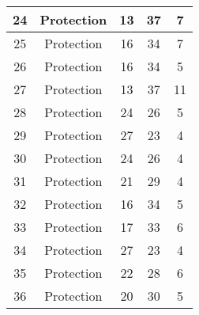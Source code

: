 \documentclass[results.tex]{subfiles}
\begin{document}
\begin{center}
\begin{tabular}{| c || c | c | c | c |}
            \hline
            24                      & Protection                   & 13                     & 37                      & 7                    \\
            \hline
            25                      & Protection                   & 16                     & 34                      & 7                    \\
            \hline
            26                      & Protection                   & 16                     & 34                      & 5                    \\
            \hline
            27                      & Protection                   & 13                     & 37                      & 11                   \\
            \hline
            28                      & Protection                   & 24                     & 26                      & 5                    \\
            \hline
            29                      & Protection                   & 27                     & 23                      & 4                    \\
            \hline
            30                      & Protection                   & 24                     & 26                      & 4                    \\
            \hline
            31                      & Protection                   & 21                     & 29                      & 4                    \\
            \hline
            32                      & Protection                   & 16                     & 34                      & 5                    \\
            \hline
            33                      & Protection                   & 17                     & 33                      & 6                    \\
            \hline
            34                      & Protection                   & 27                     & 23                      & 4                    \\
            \hline
            35                      & Protection                   & 22                     & 28                      & 6                    \\
            \hline
            36                      & Protection                   & 20                     & 30                      & 5                    \\

\end{tabular}
\end{center}
\end{document}
